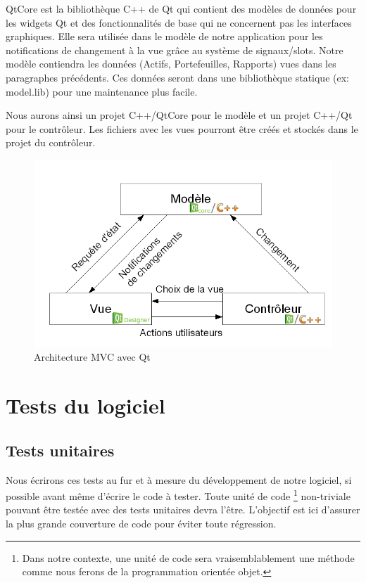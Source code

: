 \documentclass[a4paper]{report}
\begin{document}
QtCore est la bibliothèque C++ de Qt qui contient des modèles de données pour les widgets Qt et des fonctionnalités de base qui ne concernent pas les interfaces graphiques. Elle sera utilisée dans le modèle de notre application pour les notifications de changement à la vue grâce au système de signaux/slots. Notre modèle contiendra les données (Actifs, Portefeuilles, Rapports) vues dans les paragraphes précédents. Ces données seront dans une bibliothèque statique (ex: model.lib) pour une maintenance plus facile.

Nous aurons ainsi un projet C++/QtCore pour le modèle et un projet C++/Qt pour le contrôleur. Les fichiers avec les vues pourront être créés et stockés dans le projet du contrôleur.

\begin{figure}[h]
  	\center
  	\includegraphics[width=1\textwidth]{mvc.png}
  	\caption{Architecture MVC avec Qt}
    \label{fig:diagramme-mvc}
\end{figure}


\section{Tests du logiciel}

\subsection{Tests unitaires}

Nous écrirons ces tests au fur et à mesure du développement de notre logiciel, si possible avant même d'écrire le code à tester.
Toute unité de code \footnote{Dans notre contexte, une unité de code sera vraisemblablement une méthode comme nous ferons de la programmation orientée objet.} non-triviale pouvant être testée avec des tests unitaires devra l'être.
L'objectif est ici d'assurer la plus grande couverture de code pour éviter toute régression.
\end{document}
